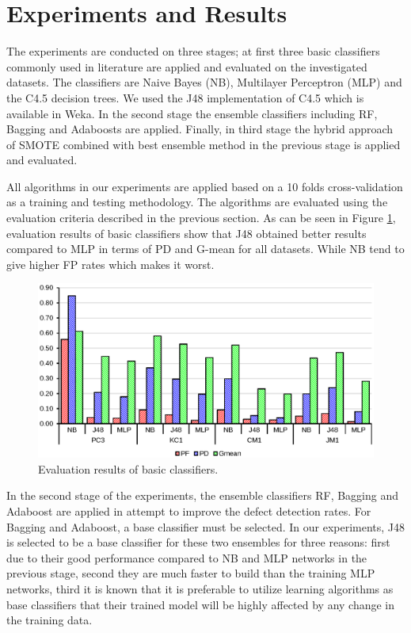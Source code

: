 \documentclass[runningheads,a4paper]{llncs}
\begin{document}
\section{Experiments and Results}
\label{experiments}

The experiments are conducted on three stages; at first three basic classifiers commonly used in literature are applied and evaluated on the investigated datasets. The classifiers are Naive Bayes (NB), Multilayer Perceptron (MLP) and the C4.5 decision trees. We used the J48 implementation of C4.5 which is available in Weka. In the second stage the ensemble classifiers including RF, Bagging and Adaboosts are applied. Finally, in third stage the hybrid approach of SMOTE combined with best ensemble method in the previous stage is applied and evaluated.

All algorithms in our experiments are applied based on a 10 folds cross-validation as a training and testing methodology. The algorithms are evaluated using the evaluation criteria described in the previous section. As can be seen in Figure  \ref{fig:basic}, evaluation results of basic classifiers show that J48 obtained better results compared to MLP in terms of PD and G-mean for all datasets. While NB tend to give higher FP rates which makes it worst. 



\begin{figure}[h]
\centering
\includegraphics[scale=0.6]{basicresults.eps}
\caption{Evaluation results of basic classifiers.}
\label{fig:basic}
\end{figure}


In the second stage of the experiments, the ensemble classifiers RF, Bagging and Adaboost are applied in attempt to improve the defect detection rates. For Bagging and Adaboost, a base classifier must be selected. In our experiments, J48 is selected to be a base classifier for these two ensembles for three reasons: first due to their good performance compared to NB and MLP networks in the previous stage, second they are much faster to build than the training MLP networks, third it is known that it is preferable to utilize learning algorithms as base classifiers that their trained model will be highly affected by any change in the training data. 
\end{document}
